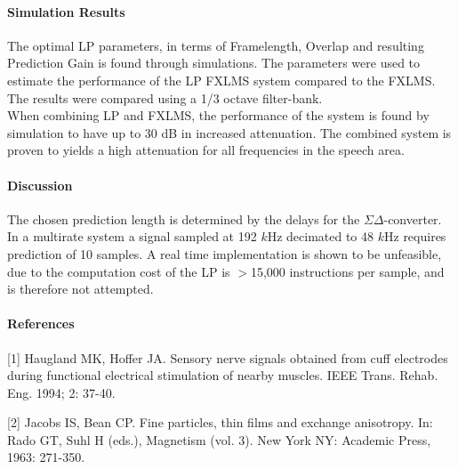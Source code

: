\documentclass[a4paper]{article}
\begin{document}
	\paragraph{Simulation Results}
	The optimal LP parameters, in terms of Framelength, Overlap and resulting Prediction Gain is found through simulations. The parameters were used to estimate the performance of the LP FXLMS system compared to the FXLMS. The results were compared using a 1/3 octave filter-bank.\\
	When combining LP and FXLMS, the performance of the system is found by simulation to have up to 30 dB in increased attenuation. The combined system is proven to yields a high attenuation for all frequencies in the speech area.
	
	\paragraph{Discussion}
	The chosen prediction length is determined by the delays for the $\Sigma\Delta$-converter. In a multirate system a signal sampled at 192 $k$Hz decimated to 48 $k$Hz requires prediction of 10 samples.  
	A real time implementation is shown to be unfeasible, due to the computation cost of the LP is $>$15,000 instructions per sample, and is therefore not attempted.
	
	
	\paragraph{References}
	\begin{description}
		\item{[1]} Haugland MK, Hoffer JA. Sensory nerve signals obtained from cuff electrodes during functional electrical stimulation of nearby muscles. IEEE Trans. Rehab. Eng. 1994; 2: 37-40.
		
		\item{[2]} Jacobs IS, Bean CP. Fine particles, thin films and exchange anisotropy. In: Rado GT, Suhl H (eds.), Magnetism (vol. 3). New York NY: Academic Press, 1963: 271-350.
	\end{description}
\end{document}
